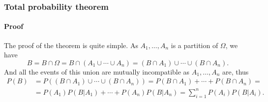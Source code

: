 \begin{frame}
	\frametitle{Total probability theorem}
	\framesubtitle{Proof}
	The proof of the theorem is quite simple.
	As $A_1,\ldots,A_n$ is a partition of $\Omega$, we have 
	\[
	B = B\cap \Omega = B\cap (A_1\cup \cdots \cup A_n) = (B\cap A_1)\cup \cdots \cup (B\cap A_n).
	\]
	And all the events of this union are mutually incompatible as $A_1,\ldots,A_n$ are, thus
	\begin{align*}
	P(B) &= P((B\cap A_1)\cup \cdots \cup (B\cap A_n)) = P(B\cap A_1)+\cdots + P(B\cap A_n) =\\
	&= P(A_1)P(B|A_1)+\cdots + P(A_n)P(B|A_n) = \sum_{i=1}^n P(A_i)P(B|A_i).
	\end{align*}
	
\begin{center}
\end{center}

\end{frame}


